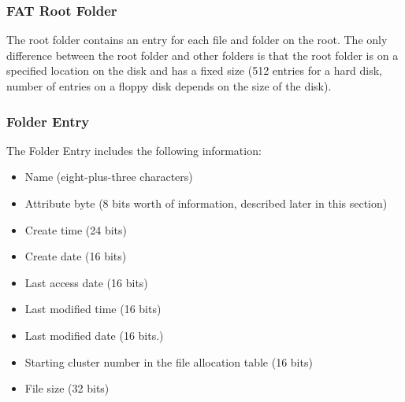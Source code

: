 % 
% 
\begin{frame}[fragile]
    \frametitle{FAT Root Folder}
    The root folder contains an entry for each file and folder on the root. The only difference between the root folder and other folders is that {\color{red}the root folder is on a specified location on the disk and has a fixed size} (512 entries for a hard disk, number of entries on a floppy disk depends on the size of the disk).

\end{frame}
% 
% 
\begin{frame}[fragile]
    \frametitle{Folder Entry}
    The Folder Entry includes the following information:

    \begin{itemize}
        \item Name (eight-plus-three characters)
        \item Attribute byte (8 bits worth of information, described later in this section)
        \item Create time (24 bits)
        \item Create date (16 bits)
        \item Last access date (16 bits)
        \item Last modified time (16 bits)
        \item Last modified date (16 bits.)
        \item Starting cluster number in the file allocation table (16 bits)
        \item File size (32 bits)
    \end{itemize}
\end{frame}
% 
% 
